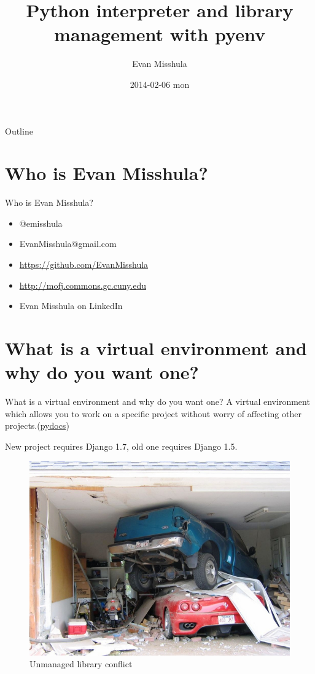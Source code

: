 \documentclass[bigger]{beamer}
\author{Evan Misshula}
\date{2014-02-06 mon}
\title{Python interpreter and library management with pyenv}
\begin{document}
\maketitle
\begin{frame}{Outline}
\tableofcontents
\end{frame}


\section{Who is Evan Misshula?}
\label{sec-1}
\begin{frame}[label=sec-1-1]{Who is Evan Misshula?}
\begin{itemize}
\item @emisshula
\item EvanMisshula@gmail.com
\item \url{https://github.com/EvanMisshula}
\item \url{http://mofj.commons.gc.cuny.edu}
\item Evan Misshula on LinkedIn
\end{itemize}
\end{frame}

\section{What is a virtual environment and why do you want one?}

\label{sec-2}
\begin{frame}[label=sec-2-1]{What is a virtual environment and why do you want one?}
A virtual environment which allows you to work on a specific
project without worry of affecting other projects.(\href{http://docs.python-guide.org/en/latest/dev/virtualenvs/}{pydocs})
\begin{exampleblock}{New project requires Django 1.7, old one requires Django 1.5.}
\end{exampleblock}
\end{frame}

\begin{frame}[label=sec-2-2]{}
\begin{figure}[htb]
\centering
\includegraphics[width=.9\linewidth]{./images/2CarGarage1.jpg}
\caption{Unmanaged library conflict}
\end{figure}
\end{frame}
\end{document}
